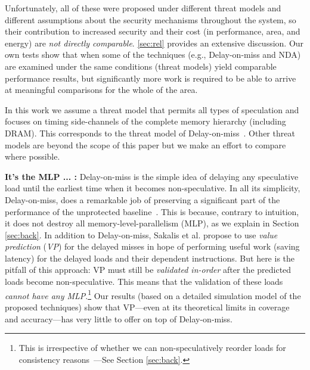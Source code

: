 Unfortunately, all of these were proposed under different threat models and different assumptions about the security mechanisms throughout the system, so their contribution to increased security and their cost (in performance, area, and energy) are \emph{not directly comparable}. \autoref{sec:rel} provides an extensive discussion. Our own tests show that when some of the techniques (e.g., Delay-on-miss and NDA) are examined under the same conditions (threat models) yield comparable performance results, but significantly more work is required to be able to arrive at meaningful comparisons for the whole of the area.

In this work we assume a threat model that permits all types of speculation and focuses on timing side-channels of the complete memory hierarchy (including DRAM). This corresponds to the threat model of 
Delay-on-miss~\cite{sakalis2019efficient}. Other threat models are beyond the scope of this paper {\color{red} but we make an effort to compare where possible}. %

\noindent \textbf{It's the MLP ... :} Delay-on-miss is the simple idea of delaying any speculative load until the earliest time when it becomes non-speculative. In all its simplicity, Delay-on-miss, does a remarkable job of preserving a significant part of the performance of the unprotected baseline~\cite{sakalis2019efficient}. This is because, contrary to intuition, it does not destroy all memory-level-parallelism (MLP), as we explain in Section \ref{sec:back}.
In addition to Delay-on-miss, Sakalis et al. propose to use \emph{value prediction} (\emph{VP}) for the delayed misses in hope of performing useful work (saving latency) for the delayed loads and their dependent instructions. But here is the pitfall of this approach: VP must still be \emph{validated in-order} after the predicted loads become non-speculative. This means that the validation of these loads \emph{cannot have any MLP}.\footnote{This is irrespective of whether we can non-speculatively reorder loads for consistency reasons~\cite{aros-isca17}---See Section \ref{sec:back}.} {\color{red} Our results (based on a detailed simulation model of the proposed techniques) show that VP---even at its theoretical limits in coverage and accuracy---has very little to offer on top of Delay-on-miss.}

